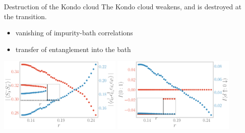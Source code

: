 \documentclass[8pt,aspectratio=169]{beamer}
\newcommand{\nitem}{\item[\ding{51}]}
\begin{document}
\begin{frame}{Destruction of the Kondo cloud}
\centering
The Kondo cloud \alert{weakens, and is destroyed} at the transition.

\vspace*{\fill}

\begin{minipage}{0.4\textwidth}
\begin{itemize}
	\nitem vanishing of impurity-bath correlations
\end{itemize}
\end{minipage}
\hspace*{\fill}
\begin{minipage}{0.4\textwidth}
\begin{itemize}
	\nitem transfer of entanglement into the bath
\end{itemize}
\end{minipage}

\vspace*{\fill}

\includegraphics[width=0.45\textwidth]{pairing.pdf}
\hspace*{\fill}
\includegraphics[width=0.45\textwidth]{I_r.pdf}
\end{frame}
\end{document}
